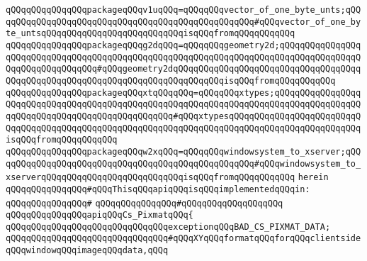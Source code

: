 \verb|qQQqqQQqqQQqqQQqpackageqQQqv1uqQQq=qQQqqQQqvector_of_one_byte_unts;qQQqqQQqqQQqqQQqqQQqqQQqqQQqqQQqqQQqqQQqqQQqqQQqqQQq#qQQqvector_of_one_byte_untsqQQqqQQqqQQqqQQqqQQqqQQqqQQqisqQQqfromqQQqqQQqqQQq|\newline
\verb|qQQqqQQqqQQqqQQqpackageqQQqg2dqQQq=qQQqqQQqgeometry2d;qQQqqQQqqQQqqQQqqQQqqQQqqQQqqQQqqQQqqQQqqQQqqQQqqQQqqQQqqQQqqQQqqQQqqQQqqQQqqQQqqQQqqQQqqQQqqQQqqQQqqQQq#qQQqgeometry2dqQQqqQQqqQQqqQQqqQQqqQQqqQQqqQQqqQQqqQQqqQQqqQQqqQQqqQQqqQQqqQQqqQQqqQQqqQQqqQQqisqQQqfromqQQqqQQqqQQq|\newline
\verb|qQQqqQQqqQQqqQQqpackageqQQqxtqQQqqQQq=qQQqqQQqxtypes;qQQqqQQqqQQqqQQqqQQqqQQqqQQqqQQqqQQqqQQqqQQqqQQqqQQqqQQqqQQqqQQqqQQqqQQqqQQqqQQqqQQqqQQqqQQqqQQqqQQqqQQqqQQqqQQqqQQqqQQq#qQQqxtypesqQQqqQQqqQQqqQQqqQQqqQQqqQQqqQQqqQQqqQQqqQQqqQQqqQQqqQQqqQQqqQQqqQQqqQQqqQQqqQQqqQQqqQQqqQQqqQQqisqQQqfromqQQqqQQqqQQq|\newline
\verb|qQQqqQQqqQQqqQQqpackageqQQqw2xqQQq=qQQqqQQqwindowsystem_to_xserver;qQQqqQQqqQQqqQQqqQQqqQQqqQQqqQQqqQQqqQQqqQQqqQQqqQQq#qQQqwindowsystem_to_xserverqQQqqQQqqQQqqQQqqQQqqQQqqQQqisqQQqfromqQQqqQQqqQQq|\newline
\verb|herein|\newline
\newline
\verb|qQQqqQQqqQQqqQQq#qQQqThisqQQqapiqQQqisqQQqimplementedqQQqin:|\newline
\verb|qQQqqQQqqQQqqQQq#|\newline
\verb|qQQqqQQqqQQqqQQq#qQQqqQQqqQQqqQQqqQQq|\newline
\newline
\verb|qQQqqQQqqQQqqQQqapiqQQqCs_PixmatqQQq{|\newline
\newline
\verb|qQQqqQQqqQQqqQQqqQQqqQQqqQQqqQQqexceptionqQQqBAD_CS_PIXMAT_DATA;|\newline
\newline
\verb|qQQqqQQqqQQqqQQqqQQqqQQqqQQqqQQq#qQQqXYqQQqformatqQQqforqQQqclientsideqQQqwindowqQQqimageqQQqdata,qQQq|\newline

